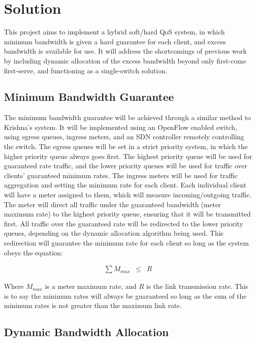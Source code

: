 \documentclass[accepted,single]{gipaper}
\begin{document}
\section{Solution}
\label{solution}

This project aims to implement a hybrid soft/hard QoS system, in which minimum bandwidth is given a hard guarantee for each client, and excess bandwidth is available for use. It will address the shortcomings of previous work by including dynamic allocation of the excess bandwidth beyond only first-come first-serve, and functioning as a single-switch solution.

\subsection{Minimum Bandwidth Guarantee}
\label{sol_min_band}

The minimum bandwidth guarantee will be achieved through a similar method to Krishna’s \cite{Krishna:2016} system. It will be implemented using an OpenFlow enabled switch, using egress queues, ingress meters, and an SDN controller remotely controlling the switch. The egress queues will be set in a strict priority system, in which the higher priority queue always goes first. The highest priority queue will be used for guaranteed rate traffic, and the lower priority queues will be used for traffic over clients’ guaranteed minimum rates. The ingress meters will be used for traffic aggregation and setting the minimum rate for each client. Each individual client will have a meter assigned to them, which will measure incoming/outgoing traffic. The meter will direct all traffic under the guaranteed bandwidth (meter maximum rate) to the highest priority queue, ensuring that it will be transmitted first. All traffic over the guaranteed rate will be redirected to the lower priority queues, depending on the dynamic allocation algorithm being used. This redirection will guarantee the minimum rate for each client so long as the system obeys the equation:

\begin{eqnarray*}
	\sum M_{max} &\leq& R
\end{eqnarray*}

Where $M_{max}$ is a meter maximum rate, and $R$ is the link transmission rate. This is to say the minimum rates will always be guaranteed so long as the sum of the minimum rates is not greater than the maximum link rate.

\subsection{Dynamic Bandwidth Allocation}
\label{sol_dynamic_alloc}
\end{document}
